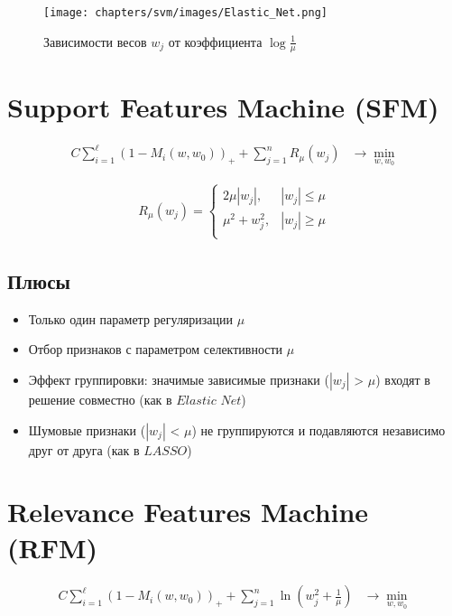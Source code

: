 \begin{figure}[ht]
    \centering
    \texttt{[image: chapters/svm/images/Elastic\_Net.png]}
    \caption{Зависимости весов \(w_j\) от коэффициента \(\log \frac{1}{\mu}\)}
    \label{fig:mpr}
\end{figure}

\section{Support Features Machine (SFM)}

\begin{align*}
    C \sum_{i=1}^{\ell} \left(1 - M_i(w, w_0)\right)_+ + \sum_{j=1}^{n} R_{\mu}(w_{j}) & \rightarrow \min_{w, w_0}
\end{align*}

\begin{align*}
R_{\mu}(w_j)=
    \begin{cases}
        2\mu |w_j|, & |w_j| \leq \mu\\
        \mu^2 + w_j^2, & |w_j| \geq \mu \\
    \end{cases}
\end{align*}

\subsection*{Плюсы}
\begin{itemize}
    \item Только один параметр регуляризации \(\mu\)
    \item Отбор признаков с параметром селективности \(\mu\)
    \item Эффект группировки: значимые зависимые признаки ($|w_j|$ > \(\mu\)) входят в решение совместно (как в $Elastic$ $Net$)
    \item Шумовые признаки ($|w_j|$ < \(\mu\)) не группируются и подавляются независимо друг от друга (как в $LASSO$)
\end{itemize}

\section{Relevance Features Machine (RFM)}

\begin{align*}
    C \sum_{i=1}^{\ell} \left(1 - M_i(w, w_0)\right)_+ + \sum_{j=1}^{n} \ln(w_j^2 + \frac{1}{\mu}) & \rightarrow \min_{w, w_0}
\end{align*}

